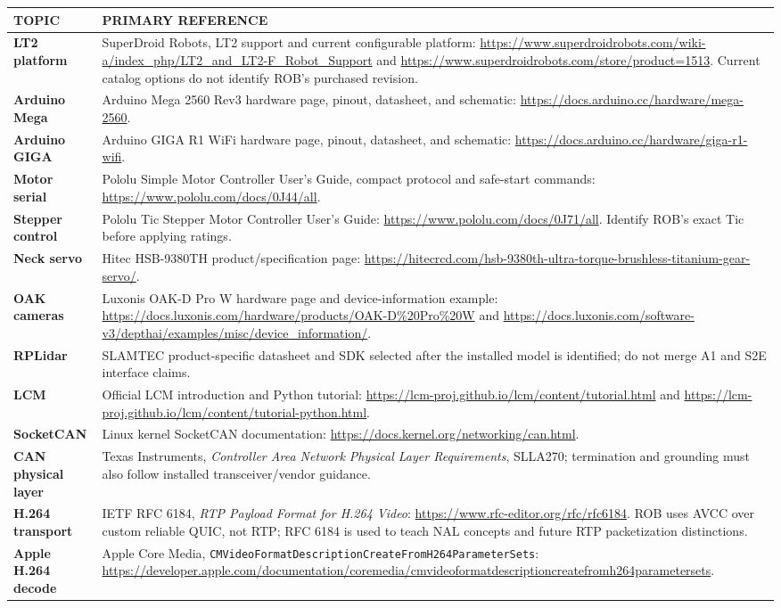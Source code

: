 \documentclass[10pt,openany]{book}
\begin{document}
\begin{tabularx}{\textwidth}{>{\robcondensed\bfseries}p{1.3in} X}
\toprule
TOPIC & PRIMARY REFERENCE\\
\midrule
LT2 platform & SuperDroid Robots, LT2 support and current configurable platform: \url{https://www.superdroidrobots.com/wiki-a/index_php/LT2_and_LT2-F_Robot_Support} and \url{https://www.superdroidrobots.com/store/product=1513}. Current catalog options do not identify ROB's purchased revision.\\
Arduino Mega & Arduino Mega 2560 Rev3 hardware page, pinout, datasheet, and schematic: \url{https://docs.arduino.cc/hardware/mega-2560}.\\
Arduino GIGA & Arduino GIGA R1 WiFi hardware page, pinout, datasheet, and schematic: \url{https://docs.arduino.cc/hardware/giga-r1-wifi}.\\
Motor serial & Pololu Simple Motor Controller User's Guide, compact protocol and safe-start commands: \url{https://www.pololu.com/docs/0J44/all}.\\
Stepper control & Pololu Tic Stepper Motor Controller User's Guide: \url{https://www.pololu.com/docs/0J71/all}. Identify ROB's exact Tic before applying ratings.\\
Neck servo & Hitec HSB-9380TH product/specification page: \url{https://hitecrcd.com/hsb-9380th-ultra-torque-brushless-titanium-gear-servo/}.\\
OAK cameras & Luxonis OAK-D Pro W hardware page and device-information example: \url{https://docs.luxonis.com/hardware/products/OAK-D\%20Pro\%20W} and \url{https://docs.luxonis.com/software-v3/depthai/examples/misc/device_information/}.\\
RPLidar & SLAMTEC product-specific datasheet and SDK selected after the installed model is identified; do not merge A1 and S2E interface claims.\\
LCM & Official LCM introduction and Python tutorial: \url{https://lcm-proj.github.io/lcm/content/tutorial.html} and \url{https://lcm-proj.github.io/lcm/content/tutorial-python.html}.\\
SocketCAN & Linux kernel SocketCAN documentation: \url{https://docs.kernel.org/networking/can.html}.\\
CAN physical layer & Texas Instruments, \textit{Controller Area Network Physical Layer Requirements}, SLLA270; termination and grounding must also follow installed transceiver/vendor guidance.\\
H.264 transport & IETF RFC 6184, \textit{RTP Payload Format for H.264 Video}: \url{https://www.rfc-editor.org/rfc/rfc6184}. ROB uses AVCC over custom reliable QUIC, not RTP; RFC 6184 is used to teach NAL concepts and future RTP packetization distinctions.\\
Apple H.264 decode & Apple Core Media, \texttt{CMVideoFormatDescriptionCreateFromH264ParameterSets}: \url{https://developer.apple.com/documentation/coremedia/cmvideoformatdescriptioncreatefromh264parametersets}.\\
\bottomrule
\end{tabularx}
\end{document}
